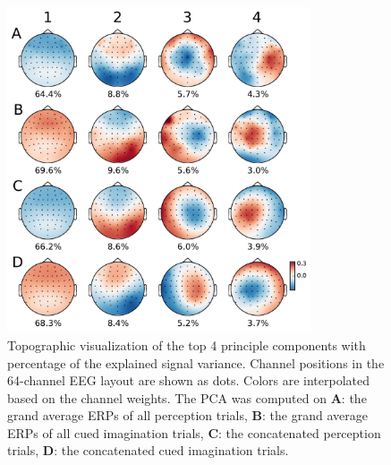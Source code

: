 \begin{figure}[t] 
  \begin{center}
    \includegraphics[width=0.8\textwidth,keepaspectratio=true]{Figures/principle_components.pdf}
    \caption{%
Topographic visualization of the top 4 principle components with percentage of the explained signal variance. %
Channel positions in the 64-channel EEG layout are shown as dots.
Colors are interpolated based on the channel weights.
The PCA was computed on
\textbf{A}: the grand average \acp{ERP} of all perception trials,
\textbf{B}: the grand average \acp{ERP} of all cued imagination trials,
\textbf{C}: the concatenated perception trials,
\textbf{D}: the concatenated cued imagination trials.
}
    \label{fig:components}
  \end{center}
\end{figure}

